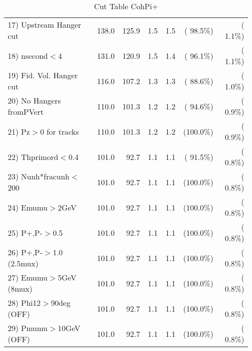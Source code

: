 \begin{table}[h!]
\begin{tabular}{||l||r|r|r|r|r|r||}
 17) Upstream Hanger cut  &        138.0 &        125.9 &          1.5 &          1.5 & ( 98.5\%) & (  1.1\%) \\
 18) nsecond$<$4          &        131.0 &        120.9 &          1.5 &          1.4 & ( 96.1\%) & (  1.1\%) \\
 19) Fid. Vol. Hanger cut &        116.0 &        107.2 &          1.3 &          1.3 & ( 88.6\%) & (  1.0\%) \\
 20) No Hangers fromPVert &        110.0 &        101.3 &          1.2 &          1.2 & ( 94.6\%) & (  0.9\%) \\
 21) Pz$>$0 for tracks    &        110.0 &        101.3 &          1.2 &          1.2 & (100.0\%) & (  0.9\%) \\
 22) Thprimord$<$0.4      &        101.0 &         92.7 &          1.1 &          1.1 & ( 91.5\%) & (  0.8\%) \\
 23) Nunh*fracunh$<$200   &        101.0 &         92.7 &          1.1 &          1.1 & (100.0\%) & (  0.8\%) \\
 24) Emumu$>$2GeV         &        101.0 &         92.7 &          1.1 &          1.1 & (100.0\%) & (  0.8\%) \\
 25) P+,P-$>$0.5          &        101.0 &         92.7 &          1.1 &          1.1 & (100.0\%) & (  0.8\%) \\
 26) P+,P-$>$1.0 (2.5mux) &        101.0 &         92.7 &          1.1 &          1.1 & (100.0\%) & (  0.8\%) \\
 27) Emumu$>$5GeV  (8mux) &        101.0 &         92.7 &          1.1 &          1.1 & (100.0\%) & (  0.8\%) \\
 28) Phi12$>$90deg  (OFF) &        101.0 &         92.7 &          1.1 &          1.1 & (100.0\%) & (  0.8\%) \\
 29) Pmumu$>$10GeV  (OFF) &        101.0 &         92.7 &          1.1 &          1.1 & (100.0\%) & (  0.8\%) \\
 \hline
 \hline
 \end{tabular}
 \caption{Cut Table  CohPi+   }
 \label{tab-cutcohjpsi-mumu_cohpip}
 \end{table}
